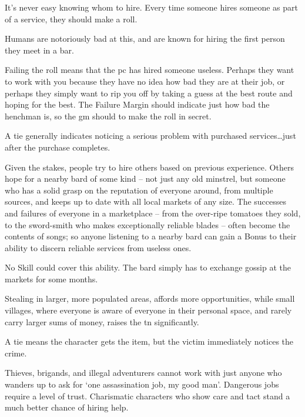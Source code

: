 \begin{multicols}{2}
It's never easy knowing whom to hire.
Every time someone hires someone as part of a service, they should make a roll.

Humans are notoriously bad at this, and are known for hiring the first person they meet in a bar.

Failing the roll means that the \gls{pc} has hired someone useless.
Perhaps they want to work with you because they have no idea how bad they are at their job, or perhaps they simply want to rip you off by taking a guess at the best route and hoping for the best.
The Failure Margin should indicate just how bad the henchman is, so the \gls{gm} should to make the roll in secret.

A tie generally indicates noticing a serious problem with purchased services\ldots just after the purchase completes.

Given the stakes, people try to hire others based on previous experience.
Others hope for a nearby bard of some kind -- not just any old minstrel, but someone who has a solid grasp on the reputation of everyone around, from multiple sources, and keeps up to date with all local markets of any size.
The successes and failures of everyone in a marketplace -- from the over-ripe tomatoes they sold, to the sword-smith who makes exceptionally reliable blades -- often become the contents of songs; so anyone listening to a nearby bard can gain a Bonus to their ability to discern reliable services from useless ones.

No Skill could cover this ability.
The bard simply has to exchange gossip at the markets for some months.

Stealing in larger, more populated areas, affords more opportunities, while small \glspl{village}, where everyone is aware of everyone in their personal space, and rarely carry larger sums of money, raises the \gls{tn} significantly.

A tie means the character gets the item, but the victim immediately notices the crime.

\larcenyChart

Thieves, brigands, and illegal adventurers cannot work with just anyone who wanders up to ask for `one assassination job, my good man'.
Dangerous jobs require a level of trust.
Charismatic characters who show care and tact stand a much better chance of hiring help.


\end{multicols}
